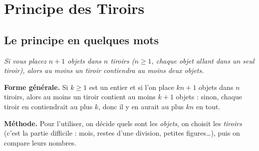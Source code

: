 \chapter{Principe des Tiroirs}

%
%
%
%
%

\section*{Le principe en quelques mots}
\begin{highlightbox}
    \emph{Si vous placez \( n+1 \) objets dans \( n \) tiroirs (\( n \geq 1 \), chaque objet allant dans un seul tiroir), alors au moins un tiroir contiendra au moins deux objets.}
\end{highlightbox}

\noindent\textbf{Forme générale.} Si \( k \geq 1 \) est un entier et si l'on place \( kn+1 \) objets dans \( n \) tiroirs, alors au moins un tiroir contient au moins \( k+1 \) objets : sinon, chaque tiroir en contiendrait au plus \( k \), donc il y en aurait au plus \( kn \) en tout.

\noindent\textbf{Méthode.} Pour l'utiliser, on décide quels sont les \emph{objets}, on choisit les \emph{tiroirs} (c'est la partie difficile : mois, restes d'une division, petites figures\ldots), puis on compare leurs nombres.

